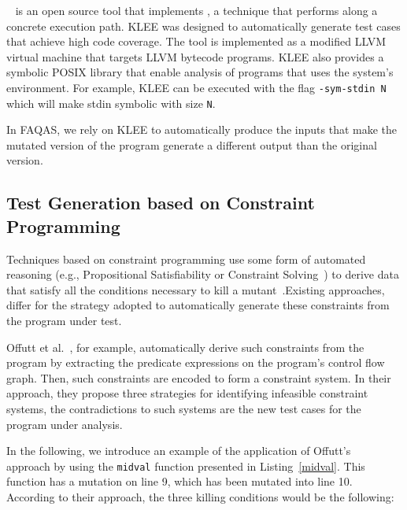 
~\cite{cadar2008klee} is an open source tool that implements {}, a technique that performs  along a concrete execution path. KLEE was designed to automatically generate test cases that achieve high code coverage. The tool is implemented as a modified LLVM virtual machine that targets LLVM bytecode programs.
KLEE also provides a symbolic POSIX library that enable analysis of programs that uses the system's environment. For example, KLEE can be executed with the flag \texttt{-sym-stdin N} which will make stdin symbolic with size \texttt{N}.  

In FAQAS, we rely on KLEE to automatically produce the inputs that make the mutated version of the program generate a different output than the original version.



\subsection{Test Generation based on Constraint Programming}
\label{sec:testGen:CP}

Techniques based on constraint programming use some form of automated reasoning (e.g., Propositional Satisfiability or Constraint Solving~\cite{SATandCPsurvey:2006}) to derive data that satisfy all the conditions necessary to kill a mutant~\cite{offutt1997automatically}.Existing approaches, differ for the strategy adopted to automatically generate these constraints from the program under test.

Offutt et al.~\cite{offutt1997automatically}, for example, automatically derive such constraints from the program by extracting the predicate expressions on the program's control flow graph.
Then, such constraints are encoded to form a constraint system. In their approach, they propose three strategies for identifying infeasible constraint systems, the contradictions to such systems are the new test cases for the program under analysis.



In the following, we introduce an example of the application of Offutt's~\cite{offutt1997automatically} approach by using the \texttt{midval} function presented in Listing~\ref{midval}. This function has a mutation on line 9, which has been mutated into line 10. According to their approach, the three killing conditions would be the following:

